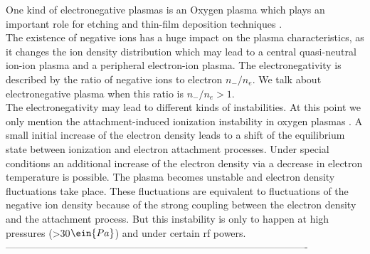 One kind of electronegative plasmas is an Oxygen plasma which plays an important role for etching and thin-film deposition techniques \cite{etching}.\\
The existence of negative ions has a huge impact on the plasma characteristics, as it changes the ion density distribution which may lead to a central quasi-neutral ion-ion plasma and a peripheral electron-ion plasma.  
The electronegativity is described by the ratio of negative ions to electron $n_-/n_e$.
We talk about electronegative plasma when this ratio is $n_-/n_e>1$. \\
The electronegativity may lead to different kinds of instabilities.
At this point we only mention the attachment-induced ionization instability in oxygen plasmas \cite{instability}.
A small initial increase of the electron density leads to a shift of the equilibrium state between ionization and electron attachment processes. 
Under special conditions an additional increase of the electron density via a decrease in electron temperature is possible. 
The plasma becomes unstable and electron density fluctuations take place. 
These fluctuations are equivalent to fluctuations of the negative ion density because of the strong coupling between the electron density and the attachment process. 
But this instability is only to happen at high pressures (>30$\ein{Pa}$) and under certain rf powers.\\

-------------------------------------------------------------------------------------------

